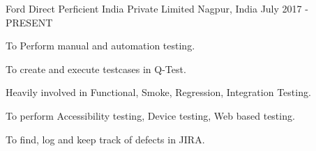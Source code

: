 \begin{cventries}
  \cventry
    {Ford Direct} %
    {Perficient India Private Limited} %
    {Nagpur, India} %
    {July 2017 - PRESENT} %
    {
      \begin{cvitems} %
        \item {To Perform manual and automation testing.}
        \item {To create and execute testcases in Q-Test.}
        \item {Heavily involved in Functional, Smoke, Regression, Integration Testing.}
        \item {To perform Accessibility testing, Device testing, Web based testing.}
        \item {To find, log and keep track of defects in JIRA.}
      \end{cvitems}
    } 

\end{cventries}
    

